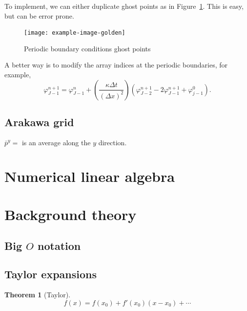 \documentclass[11pt, a4paper]{article}
\renewcommand{\phi}{\varphi}
\theoremstyle{break}
\newtheorem{thm}{Theorem}[section]
\newcommand*{\Paren}[1]{\left(#1\right)}%
\newcommand{\dt}{\Delta t}
\newcommand{\dx}{\Delta x}
\begin{document}
To implement, we can either duplicate ghost points as in Figure~\ref{fig:periodicGhost}. This is easy, but can be error prone.
\begin{figure}\centering
	\texttt{[image: example-image-golden]}
	\caption{Periodic boundary conditions ghost points}\label{fig:periodicGhost}
\end{figure}

A better way is to modify the array indices at the periodic boundaries, for example,\[\phi_{J-1}^{n+1}=\phi_{J-1}^n+\Paren{\frac{\kappa\dt}{(\dx)^2}}\Paren{\phi_{J-2}^{n+1}-2\phi_{J-1}^{n+1}+\phi^{0}_{j-1}}.\]

\subsection{Arakawa grid}

$\bar{p}^y=$ is an average along the $y$ direction.


\section{Numerical linear algebra}\label{sec:numla}


\appendix
\section{Background theory}
\subsection{\texorpdfstring{Big $O$}{Big O} notation}\label{sec:bigO}
\subsection{Taylor expansions}\label{sec:taylor}
\begin{thm}[Taylor]\label{thm:taylor}
	\[f(x)=f(x_0)+f'(x_0)(x-x_0) + \cdots\]
\end{thm}

\nocite{*}



\label{lastpage}
\end{document}
